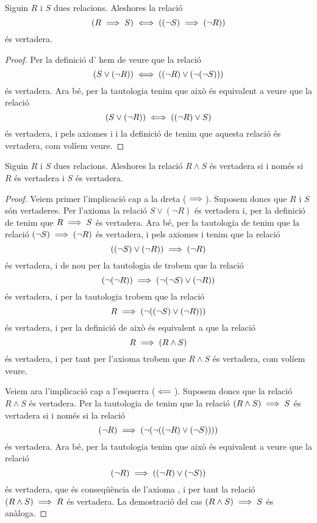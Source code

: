 \documentclass[../Apunts.tex]{subfiles}
\begin{document}
	\begin{tautology}
		\label{taut:llei de les contrarecíproques}
		Siguin \(R\) i \(S\) dues relacions. Aleshores la relació
		\[(R\implies S)\iff((\lnot S)\implies(\lnot R))\]
		és vertadera.
		\begin{proof}
			Per la definició d' hem de veure que la relació
			\[(S\lor(\lnot R))\iff((\lnot R)\lor(\lnot(\lnot S)))\]
			és vertadera. Ara bé, per la tautologia  tenim que això és equivalent a veure que la relació
			\[(S\lor(\lnot R))\iff((\lnot R)\lor S)\]
			és vertadera, i pels axiomes  i  i la definició de  tenim que aquesta relació és vertadera, com volíem veure.
		\end{proof}
	\end{tautology}
	\begin{tautology}
		\label{taut:condició equivalent a conjunció}
		Siguin \(R\) i \(S\) dues relacions. Aleshores la relació \(R\land S\) és vertadera si i només si \(R\) és vertadera i \(S\) és vertadera.
		\begin{proof}
			Veiem primer l'implicació cap a la dreta (\(\implies\)). Suposem doncs que \(R\) i \(S\) són vertaderes. Per l'axioma  la relació \(S\lor(\lnot R)\) és vertadera i, per la definició de  tenim que \(R\implies S\) és vertadera. Ara bé, per la tautologia de  tenim que la relació \((\lnot S)\implies(\lnot R)\) és vertadera, i pels axiomes  i  tenim que la relació
			\[((\lnot S)\lor(\lnot R))\implies(\lnot R)\]
			és vertadera, i de nou per la tautologia de  trobem que la relació
			\[(\lnot(\lnot R))\implies(\lnot(\lnot S)\lor(\lnot R))\]
			és vertadera, i per la tautologia  trobem que la relació
			\[R\implies(\lnot((\lnot S)\lor(\lnot R)))\]
			és vertadera, i per la definició de  això és equivalent a que la relació
			\[R\implies(R\land S)\]
			és vertadera, i per tant per l'axioma  trobem que \(R\land S\) és vertadera, com volíem veure.
			
			Veiem ara l'implicació cap a l'esquerra (\(\impliedby\)). Suposem doncs que la relació \(R\land S\) és vertadera. Per la tautologia de  tenim que la relació \((R\land S)\implies S\) és vertadera si i només si la relació
			\[(\lnot R)\implies(\lnot(\lnot((\lnot R)\lor(\lnot S))))\]
			és vertadera. Ara bé, per la tautologia  tenim que això és equivalent a veure que la relació
			\[(\lnot R)\implies((\lnot R)\lor(\lnot S))\]
			és vertadera, que és conseqüència de l'axioma , i per tant la relació \((R\land S)\implies R\) és vertadera. La demostració del cas \((R\land S)\implies S\) és anàloga.
		\end{proof}
	\end{tautology}
\end{document}
